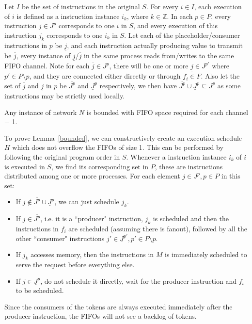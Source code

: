 \begin{definition}
Let $I$ be the set of instructions in the original $S$. For every $i \in I$, each
execution of $i$ is defined as a instruction instance $i_k$, where $k \in \mathbb{Z}$.
 In each $p \in P$, 
every instruction $j \in J^p$ corresponds to one $i$ in $S$, and every execution of this instruction $j_k$ corresponds to one $i_k$ in $S$. Let 
each of the placeholder/consumer instructions in $p$ be $\underline{j}$, and each instruction actually producing value to transmit be $\overline{j}$, every instance
of $\underline{j}$/$\overline{j}$ in the same process reads from/writes to the same FIFO channel. Note for each $\overline{j} \in J^p$,
there will be one or more  $\underline{j} \in J^{p'}$ where $p' \in P\setminus p$, and they are connected either directly or through $f_i \in F$. Also let the set of $\overline{j}$
 and $\underline{j}$ in $p$ be $\overline{J^p}$ and $\underline{J}^p$ respectively,
 we then have $\overline{J^p} \cup \underline{J}^p \subseteq J^p$ as some instructions may be strictly used locally.
\end{definition}



\begin{lemma}
\label{bounded}
Any instance of network $N$ is bounded with FIFO space required for each channel = 1.
\end{lemma}




To prove Lemma~\ref{bounded}, we can constructively create an execution schedule $H$
which does not overflow the FIFOs of size 1. This can be performed by following the original program order in $S$. 
Whenever a instruction instance $i_k$  of $i$ is executed in $S$, we find its corresponding set in $P$, these are instructions distributed among one or more processes.
For each element $j \in J^p, p \in P$ in this set:
\begin{itemize}
    \item If $j \not\in \overline{J^p} \cup \underline{J}^p$, we can just schedule $j_k$.
    \item If $j \in \overline{J^p}$, i.e. it is a ``producer" instruction, $j_k$ is scheduled and then the instructions in $f_i$ are scheduled (assuming there is fanout), followed by all the other ``consumer" instructions $j' \in \underline{J}^{p'}, p' \in P\setminus p$.
    

    \item If $j_k$ accesses memory, then the instructions in $M$ is immediately scheduled to serve the request before everything else.
    \item If $j \in \underline{J}^p$, do not schedule it directly, wait for the producer instruction and $f_i$ to be scheduled.
\end{itemize}
Since the consumers of the tokens are always executed immediately after the producer instruction, the FIFOs will not see a backlog of tokens.

